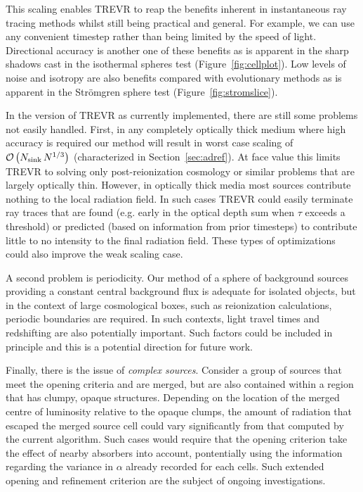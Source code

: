 \documentclass[fleq,usenatbib]{mnras}
\newcommand{\acro}{TREVR}
\newcommand{\bigO}[1]{\mathcal{O}\left(#1\right)}
\newcommand{\NK}{N_{\rm sink}}
\newcommand{\strom}{Str\"omgren}
\begin{document}
{This scaling enables \acro{} to reap the benefits inherent in instantaneous 
ray tracing methods whilst still being practical and general.  For example,
we can use any convenient timestep rather than being limited by the speed of light. Directional accuracy is another one of these benefits as is apparent in the sharp shadows cast in the isothermal spheres test (Figure~\ref{fig:cellplot}). 
Low levels of noise and isotropy are also benefits compared with evolutionary 
methods as is apparent in the \strom{} sphere test 
(Figure~\ref{fig:stromslice}).

In the version of \acro{} as currently implemented, there are still some 
problems not easily handled. First, in any completely optically thick 
medium where high accuracy is required our method will result in worst 
case scaling of $\bigO{\NK\,N^{1/3}}$ (characterized in Section~\ref{sec:adref}). 
At face value this limits \acro{} to solving only post-reionization cosmology or similar problems
that are largely optically thin.
However, in optically thick media most sources contribute nothing to the local radiation field. 
In such cases \acro{} could easily terminate ray traces that are found 
(e.g. early in the optical depth sum when $\tau$ exceeds a threshold)
or predicted (based on information from prior 
timesteps) to contribute little to no intensity to the final radiation field. These 
types of optimizations could also improve the weak scaling case.

A second problem is periodicity.  Our method of a sphere of background sources providing 
a constant central background flux is adequate for isolated objects, but in 
the context of large cosmological boxes, such as reionization calculations,
periodic boundaries are required.  In such contexts, light travel times
and redshifting are also potentially important.  Such factors could be included in principle
and this is a potential direction for future work.

Finally, there is the issue of \textit{complex sources}. 
Consider a group of sources that meet the opening criteria and are merged, 
but are also contained within a region that has clumpy, opaque structures. 
Depending on the location of the merged centre of luminosity relative to the 
opaque clumps, the amount of radiation that escaped the merged source cell 
could vary significantly from that computed by the current algorithm.
Such cases would require that the opening criterion take the effect of
nearby absorbers into account, pontentially using the information regarding
the variance in $\alpha$ already recorded for each cells.   Such extended opening
and refinement criterion are the subject of ongoing investigations.

}
\end{document}
